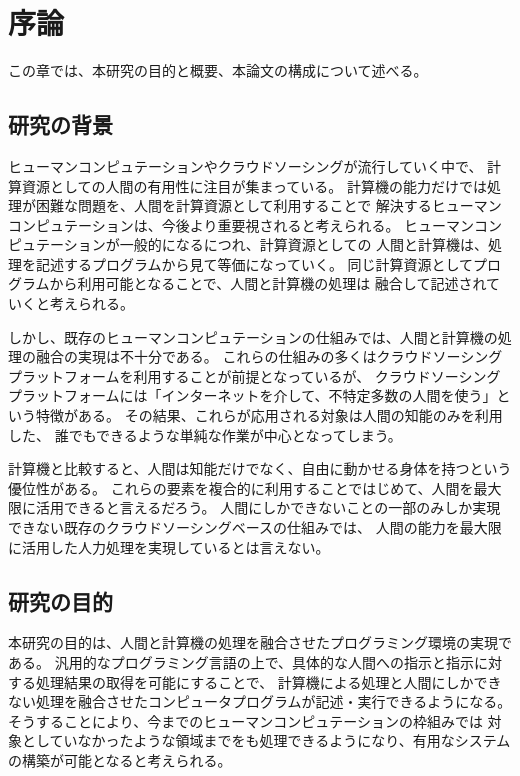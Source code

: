 \chapter{序論}\label{chap:introduction}

この章では、本研究の目的と概要、本論文の構成について述べる。

\newpage

\section{研究の背景}\label{ux7814ux7a76ux306eux80ccux666f}

ヒューマンコンピュテーションやクラウドソーシングが流行していく中で、
計算資源としての人間の有用性に注目が集まっている。
計算機の能力だけでは処理が困難な問題を、人間を計算資源として利用することで
解決するヒューマンコンピュテーションは、今後より重要視されると考えられる。
ヒューマンコンピュテーションが一般的になるにつれ、計算資源としての
人間と計算機は、処理を記述するプログラムから見て等価になっていく。
同じ計算資源としてプログラムから利用可能となることで、人間と計算機の処理は
融合して記述されていくと考えられる。

しかし、既存のヒューマンコンピュテーションの仕組みでは、人間と計算機の処理の融合の実現は不十分である。
これらの仕組みの多くはクラウドソーシングプラットフォームを利用することが前提となっているが、
クラウドソーシングプラットフォームには「インターネットを介して、不特定多数の人間を使う」という特徴がある。
その結果、これらが応用される対象は人間の知能のみを利用した、
誰でもできるような単純な作業が中心となってしまう。

計算機と比較すると、人間は知能だけでなく、自由に動かせる身体を持つという優位性がある。
これらの要素を複合的に利用することではじめて、人間を最大限に活用できると言えるだろう。
人間にしかできないことの一部のみしか実現できない既存のクラウドソーシングベースの仕組みでは、
人間の能力を最大限に活用した人力処理を実現しているとは言えない。

\section{研究の目的}\label{ux7814ux7a76ux306eux76eeux7684}

本研究の目的は、人間と計算機の処理を融合させたプログラミング環境の実現である。
汎用的なプログラミング言語の上で、具体的な人間への指示と指示に対する処理結果の取得を可能にすることで、
計算機による処理と人間にしかできない処理を融合させたコンピュータプログラムが記述・実行できるようになる。
そうすることにより、今までのヒューマンコンピュテーションの枠組みでは
対象としていなかったような領域までをも処理できるようになり、有用なシステムの構築が可能となると考えられる。

